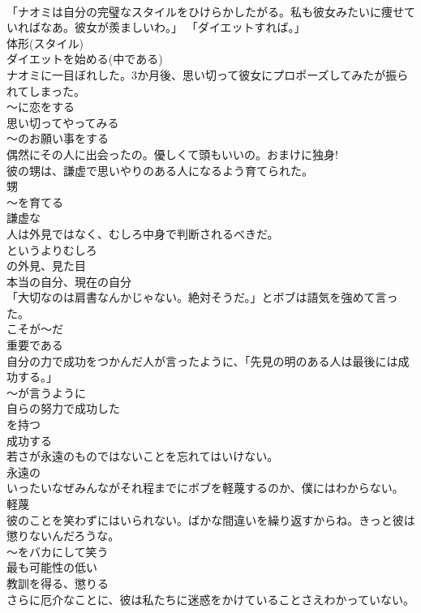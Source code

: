 \documentclass[8pt]{extreport}
\begin{document}
\begin{CJK}{UTF8}{min}
\\	「ナオミは自分の完璧なスタイルをひけらかしたがる。私も彼女みたいに痩せていればなあ。彼女が羨ましいわ。」 「ダイエットすれば。」	
\\	体形(スタイル) 
\\	ダイエットを始める(中である)
\\	ナオミに一目ぼれした。3か月後、思い切って彼女にプロポーズしてみたが振られてしまった。	
\\	～に恋をする
\\	思い切ってやってみる 
\\	～のお願い事をする
\\	偶然にその人に出会ったの。優しくて頭もいいの。おまけに独身!	
\\	彼の甥は、謙虚で思いやりのある人になるよう育てられた。	
\\	甥 
\\	～を育てる 
\\	謙虚な
\\	人は外見ではなく、むしろ中身で判断されるべきだ。	
\\	というよりむしろ
\\	の外見、見た目 
\\	本当の自分、現在の自分
\\	「大切なのは肩書なんかじゃない。絶対そうだ。」とボブは語気を強めて言った。	
\\	こそが～だ 
\\	重要である
\\	自分の力で成功をつかんだ人が言ったように、「先見の明のある人は最後には成功する。」	
\\	～が言うように 
\\	自らの努力で成功した 
\\	を持つ 
\\	成功する
\\	若さが永遠のものではないことを忘れてはいけない。	
\\	永遠の
\\	いったいなぜみんながそれ程までにボブを軽蔑するのか、僕にはわからない。	
\\	軽蔑
\\	彼のことを笑わずにはいられない。ばかな間違いを繰り返すからね。きっと彼は懲りないんだろうな。	
\\	～をバカにして笑う 
\\	最も可能性の低い 
\\	教訓を得る、懲りる
\\	さらに厄介なことに、彼は私たちに迷惑をかけていることさえわかっていない。	

\end{CJK}
\end{document}
